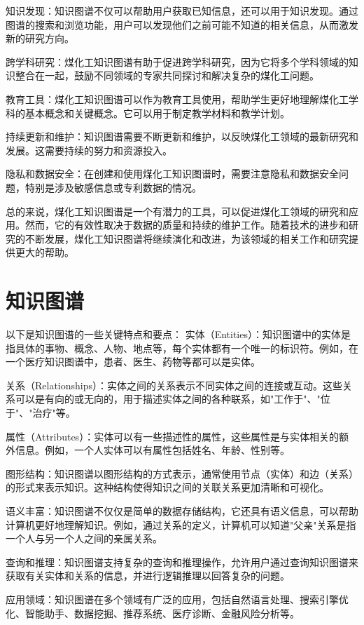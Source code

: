 知识发现：知识图谱不仅可以帮助用户获取已知信息，还可以用于知识发现。通过图谱的搜索和浏览功能，用户可以发现他们之前可能不知道的相关信息，从而激发新的研究方向。

跨学科研究：煤化工知识图谱有助于促进跨学科研究，因为它将多个学科领域的知识整合在一起，鼓励不同领域的专家共同探讨和解决复杂的煤化工问题。

教育工具：煤化工知识图谱可以作为教育工具使用，帮助学生更好地理解煤化工学科的基本概念和关键概念。它可以用于制定教学材料和教学计划。

持续更新和维护：知识图谱需要不断更新和维护，以反映煤化工领域的最新研究和发展。这需要持续的努力和资源投入。

隐私和数据安全：在创建和使用煤化工知识图谱时，需要注意隐私和数据安全问题，特别是涉及敏感信息或专利数据的情况。

总的来说，煤化工知识图谱是一个有潜力的工具，可以促进煤化工领域的研究和应用。然而，它的有效性取决于数据的质量和持续的维护工作。随着技术的进步和研究的不断发展，煤化工知识图谱将继续演化和改进，为该领域的相关工作和研究提供更大的帮助。

\section{知识图谱}

以下是知识图谱的一些关键特点和要点：
实体（Entities）：知识图谱中的实体是指具体的事物、概念、人物、地点等，每个实体都有一个唯一的标识符。例如，在一个医疗知识图谱中，患者、医生、药物等都可以是实体。

关系（Relationships）：实体之间的关系表示不同实体之间的连接或互动。这些关系可以是有向的或无向的，用于描述实体之间的各种联系，如"工作于"、"位于"、"治疗"等。

属性（Attributes）：实体可以有一些描述性的属性，这些属性是与实体相关的额外信息。例如，一个人实体可以有属性包括姓名、年龄、性别等。

图形结构：知识图谱以图形结构的方式表示，通常使用节点（实体）和边（关系）的形式来表示知识。这种结构使得知识之间的关联关系更加清晰和可视化。

语义丰富：知识图谱不仅仅是简单的数据存储结构，它还具有语义信息，可以帮助计算机更好地理解知识。例如，通过关系的定义，计算机可以知道"父亲"关系是指一个人与另一个人之间的亲属关系。

查询和推理：知识图谱支持复杂的查询和推理操作，允许用户通过查询知识图谱来获取有关实体和关系的信息，并进行逻辑推理以回答复杂的问题。

应用领域：知识图谱在多个领域有广泛的应用，包括自然语言处理、搜索引擎优化、智能助手、数据挖掘、推荐系统、医疗诊断、金融风险分析等。


